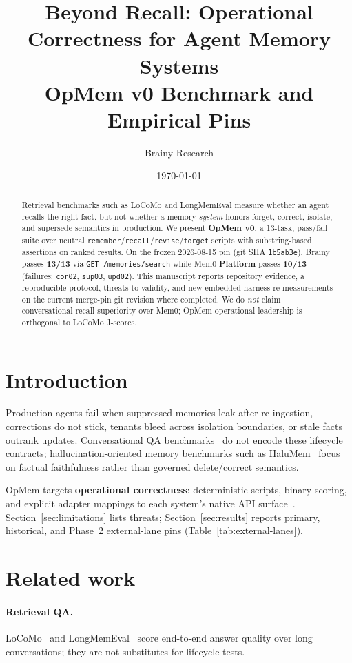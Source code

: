 \documentclass[11pt]{article}
\title{Beyond Recall: Operational Correctness for Agent Memory Systems\\
\large OpMem v0 Benchmark and Empirical Pins}
\author{Brainy Research}
\date{\today}
\begin{document}
\maketitle

\begin{abstract}
Retrieval benchmarks such as LoCoMo and LongMemEval measure whether an agent recalls
the right fact, but not whether a memory \emph{system} honors forget, correct, isolate,
and supersede semantics in production.
We present \textbf{OpMem v0}, a 13-task, pass/fail suite over neutral
\texttt{remember}/\texttt{recall}/\texttt{revise}/\texttt{forget} scripts with
substring-based assertions on ranked results.
On the frozen 2026-08-15 pin (git SHA \texttt{1b5ab3e}), Brainy passes \textbf{13/13}
via \texttt{GET /memories/search} while Mem0 \textbf{Platform} passes \textbf{10/13}
(failures: \texttt{cor02}, \texttt{sup03}, \texttt{upd02}).
This manuscript reports repository evidence, a reproducible protocol, threats to validity,
and new embedded-harness re-measurements on the current merge-pin git revision where completed.
We do \emph{not} claim conversational-recall superiority over Mem0; OpMem operational
leadership is orthogonal to LoCoMo J-scores.
\end{abstract}

\section{Introduction}
Production agents fail when suppressed memories leak after re-ingestion, corrections do not
stick, tenants bleed across isolation boundaries, or stale facts outrank updates.
Conversational QA benchmarks~\cite{maharana2024locomo,longmemeval2024} do not encode these
lifecycle contracts; hallucination-oriented memory benchmarks such as HaluMem~\cite{chen2025halumem}
focus on factual faithfulness rather than governed delete/correct semantics.

OpMem targets \textbf{operational correctness}: deterministic scripts, binary scoring, and
explicit adapter mappings to each system's native API surface~\cite{brainyopmem2026}.
Section~\ref{sec:limitations} lists threats; Section~\ref{sec:results} reports primary,
historical, and Phase~2 external-lane pins (Table~\ref{tab:external-lanes}).

\section{Related work}
\paragraph{Retrieval QA.}
LoCoMo~\cite{maharana2024locomo} and LongMemEval~\cite{longmemeval2024} score end-to-end
answer quality over long conversations; they are not substitutes for lifecycle tests.
\end{document}
